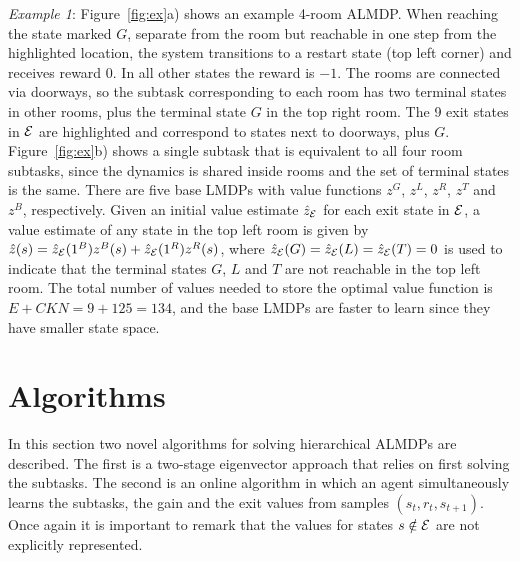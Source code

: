   \emph{Example 1}:
  Figure~\ref{fig:ex}a) shows an example 4-room ALMDP. When reaching the state marked $G$, separate from the room but reachable in one step from the highlighted location, the system transitions to a restart state (top left corner) and receives reward $0$. In all other states the reward is $-1$. The rooms are connected via doorways, so the subtask corresponding to each room has two terminal states in other rooms, plus the terminal state $G$ in the top right room. The 9 exit states in $\mathcal{E}$ are highlighted and correspond to states next to doorways, plus $G$. Figure~\ref{fig:ex}b) shows a single subtask that is equivalent to all four room subtasks, since the dynamics is shared inside rooms and the set of terminal states is the same. %
    There are five base LMDPs with value functions $z^G$, $z^L$, $z^R$, $z^T$ and $z^B$, respectively. Given an initial value estimate $\hat{z}_{\mathcal{E}}$ for each exit state in $\mathcal{E}$, a value estimate of any state in the top left room is given by $\hat{z}(s)=\hat{z}_{\mathcal{E}}(1^B) z^B(s) + \hat{z}_{\mathcal{E}}(1^R) z^R(s)$, where $\hat{z}_{\mathcal{E}}(G)=\hat{z}_{\mathcal{E}}(L)=\hat{z}_{\mathcal{E}}(T)=0$ is used to indicate that the terminal states $G$, $L$ and $T$ are not reachable in the top left room. 
    The total number of values needed to store the optimal value function is $E+CKN=9+125=134$, and the base LMDPs are faster to learn since they have smaller state space.


\section{Algorithms}
In this section two novel algorithms for solving hierarchical ALMDPs are described. The first is a two-stage eigenvector approach that relies on first solving the subtasks. The second is an online algorithm in which an agent simultaneously learns the subtasks, the gain and the exit values from samples $(s_t, r_t, s_{t+1})$.
Once again it is important to remark that the values for states $s\notin\mathcal{E}$ are not explicitly represented.

